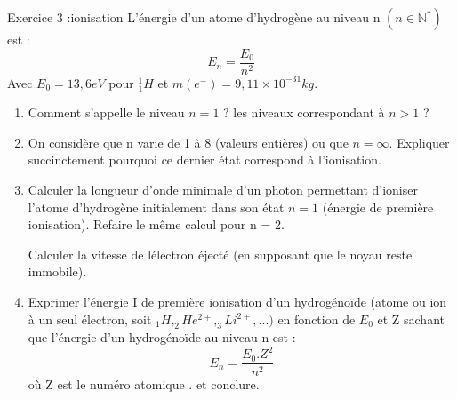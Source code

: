\documentclass[12pt, french]{article}
\begin{document}
\begin{Box2}{Exercice 3 :ionisation }
	L’énergie d’un atome d’hydrogène au niveau n $(n \in \mathbb{N}^*)$ est :$$E_n = \frac{E_0}{n^2}$$
Avec $E_0 = 13, 6eV$ pour $_1^1H$  et $m(e^-) = 9, 11 \times 10^{-31}kg$.

\begin{enumerate}
	\item  Comment s’appelle le niveau $n = 1$ ? les niveaux correspondant à $n > 1$ ?
		
	\item  On considère que n varie de 1 à 8 (valeurs entières) ou que $n = \infty$. Expliquer succinctement pourquoi ce dernier état correspond à l’ionisation.

	\item  Calculer la longueur d’onde minimale d’un photon permettant d’ioniser l’atome d’hydrogène initialement dans son état     $n = 1$ (énergie de première ionisation). Refaire le même calcul pour n = 2.

		Calculer la vitesse de lélectron éjecté (en supposant que le noyau reste immobile).
	\item Exprimer l’énergie I de première ionisation d’un hydrogénoïde (atome ou ion à un seul électron, soit $_1H,_2He^{2+},_3Li^{2+}, ...)$ en fonction de $E_0$ et Z sachant que l’énergie d’un hydrogénoïde au niveau n est : $$E_n = \frac{E_0.Z^2}{n^2}$$
		où Z est le numéro atomique . et conclure.
		
\end{enumerate}


\end{Box2}










\end{document}
